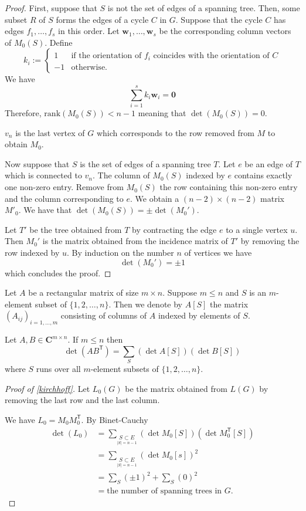 \begin{proof}
First, suppose that $S$ is not the set of edges of a spanning tree. Then, some subset $R$ of $S$ forms the edges of a cycle $C$ in $G$. Suppose that the cycle $C$ has edges $f_{1},\dots,f_{s}$ in this order. Let $\boldsymbol{w}_{1},\dots,\boldsymbol{w}_{s}$ be the corresponding column vectors of $M_{0}(S)$. Define
$$
k_{i}:= \begin{cases}
1 & \text{if the orientation of }f_{i}\text{ coincides with the orientation of }C \\
-1 & \text{otherwise.}
\end{cases}
$$
We have
$$
\sum_{i=1}^{s} k_{i}\boldsymbol{w}_{i}=\boldsymbol{0}
$$
Therefore, $\mathrm{rank}(M_{0}(S))<n-1$ meaning that $\det(M_{0}(S))=0$.

\begin{reminder}
$v_{n}$ is the last vertex of $G$ which corresponds to the row removed from $M$ to obtain $M_{0}$.
\end{reminder}
Now suppose that $S$ is the set of edges of a spanning tree $T$. Let $e$ be an edge of $T$ which is connected to $v_{n}$. The column of $M_{0}(S)$ indexed by $e$ contains exactly one non-zero entry. Remove from $M_{0}(S)$ the row containing this non-zero entry and the column corresponding to $e$. We obtain a $(n-2)\times(n-2)$ matrix $M'_{0}$. We have that $\det(M_{0}(S))=\pm \det(M_{0}')$.

Let $T'$ be the tree obtained from $T$ by contracting the edge $e$ to a single vertex $u$. Then $M_{0}'$ is the matrix obtained from the incidence matrix of $T'$ by removing the row indexed by $u$. By induction on the number $n$ of vertices we have 
$$
\det(M_{0}')=\pm 1
$$
which concludes the proof.
\end{proof}
\begin{definition}
Let $A$ be a rectangular matrix of size $m\times n$. Suppose $m\le n$ and $S$ is an $m$-element subset of $\{ 1,2,\dots,n \}$. Then we denote by $A[S]$ the matrix $(A_{ij})_{i=1,\dots,m}$ consisting of columns of $A$ indexed by elements of $S$.
\end{definition}
\begin{theorem}\label{cauchybinet}
Let $A,B\in \mathbf{C}^{m\times n}$. If $m \le n$ then 
$$
\det(AB^{\mathsf{T}})=\sum _{S}(\det A[S])(\det B[S])
$$
where $S$ runs over all $m$-element subsets of $\{ 1,2,\dots,n \}$.
\end{theorem}
\begin{proof}[Proof of \ref{kirchhoff}]
Let $L_{0}(G)$ be the matrix obtained from $L(G)$ by removing the last row and the last column.

We have $L_{0}=M_{0}M_{0}^{\mathsf{T}}$. By Binet-Cauchy 
\begin{align*}
\det(L_{0}) & =\sum _{\underset{|S|=n-1}{S\subset E}}(\det M_{0}[S])(\det M_{0}^{\mathsf{T}}[S]) \\
 & =\sum _{\underset{|S|=n-1}{S\subset E}}(\det M_{0}[s])^{2} \\
 & =\sum _{S}(\pm 1)^{2}+\sum _{S}(0)^{2} \\
 & =\text{the number of spanning trees in }G.
\end{align*}
\end{proof}
